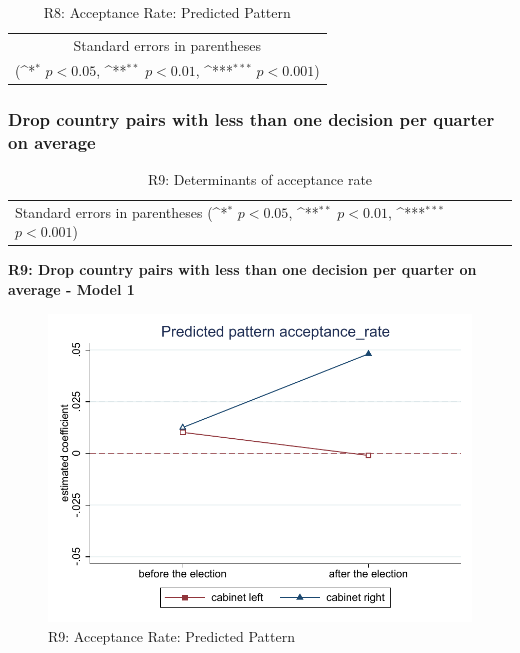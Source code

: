 \documentclass[10pt,a4paper]{scrartcl}
\begin{document}
\begin{table}[!ht]\centering
	\footnotesize
	\renewcommand{\arraystretch}{1.2}
	\def\sym#1{\ifmmode^{#1}\else\(^{#1}\)\fi}
	\caption{R8: Acceptance Rate: Predicted Pattern}
	\begin{tabular}{l*{2}{c}}
		\hline\hline
		
		\hline\hline
		\multicolumn{3}{c}{\footnotesize Standard errors in parentheses} \\
		\multicolumn{3}{c}{\footnotesize (\sym{*} \(p<0.05\), \sym{**} \(p<0.01\), \sym{***} \(p<0.001\))} \\
	\end{tabular}
\end{table}





\clearpage
\FloatBarrier
\subsubsection{Drop country pairs with less than one decision per quarter on average}
\begin{table}[!ht]\centering
	\renewcommand{\arraystretch}{1.25}
	\small
	\def\sym#1{\ifmmode^{#1}\else\(^{#1}\)\fi}
	\caption{R9: Determinants of acceptance rate}
	\begin{tabular}{l*{3}{c}}
		\hline\hline
		
		\hline\hline
		\multicolumn{4}{l}{\footnotesize Standard errors in parentheses (\sym{*} \(p<0.05\), \sym{**} \(p<0.01\), \sym{***} \(p<0.001\))}\\
	\end{tabular}
\end{table}

\clearpage
\textbf{R9: Drop country pairs with less than one decision per quarter on average - Model 1}
\begin{figure}[!ht]
	\centering
	\includegraphics[width=1\textwidth]{figures_edited/acceptance_rate_graph1_R9.pdf}
	\caption{R9: Acceptance Rate: Predicted Pattern}
\end{figure}
\end{document}

